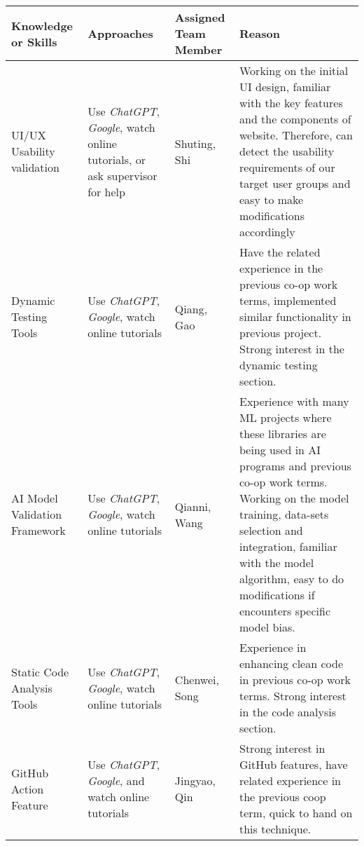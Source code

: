 \documentclass[12pt, titlepage]{article}
\begin{document}
\begin{enumerate}
  \begin{table}[]
    \begin{tabular}{| p{3cm} | p{3.5cm} | p{2cm} | p{5cm} |}
    \hline
      \textbf{Knowledge or Skills} & \textbf{Approaches} & \textbf{Assigned Team Member} & \textbf{Reason} \\
    \hline
      \raggedright UI/UX Usability validation & \raggedright Use \textit{ChatGPT}, \textit{Google}, watch online tutorials, or ask supervisor for help  & Shuting, Shi & Working on the initial UI design, familiar with the key features and the components of website. Therefore, can detect the usability requirements of our target user groups and easy to make modifications accordingly \\
    \hline
      \raggedright  Dynamic Testing Tools & \raggedright Use \textit{ChatGPT}, \textit{Google}, watch online tutorials & Qiang, Gao & Have the related experience in the previous co-op work terms, implemented similar functionality in previous project. Strong interest in the dynamic testing section. \\
    \hline
      \raggedright AI Model Validation Framework & \raggedright Use \textit{ChatGPT}, \textit{Google}, watch online tutorials & Qianni, Wang & Experience with many ML projects where these libraries are being used in AI programs and previous co-op work terms. Working on the model training,  data-sets selection and integration, familiar with the model algorithm, easy to do modifications if encounters specific model bias. \\
    \hline
      \raggedright Static Code Analysis Tools & \raggedright Use \textit{ChatGPT}, \textit{Google}, watch online tutorials & Chenwei, Song & Experience in enhancing clean code in previous co-op work terms. Strong interest in the code analysis section. \\
    \hline
      \raggedright GitHub Action Feature & \raggedright Use \textit{ChatGPT}, \textit{Google}, and watch online tutorials & Jingyao, Qin & Strong interest in GitHub features, have related experience in the previous coop term, quick to hand on this technique. \\
    \hline
    \end{tabular}
\end{table}


\end{enumerate}
\end{document}
